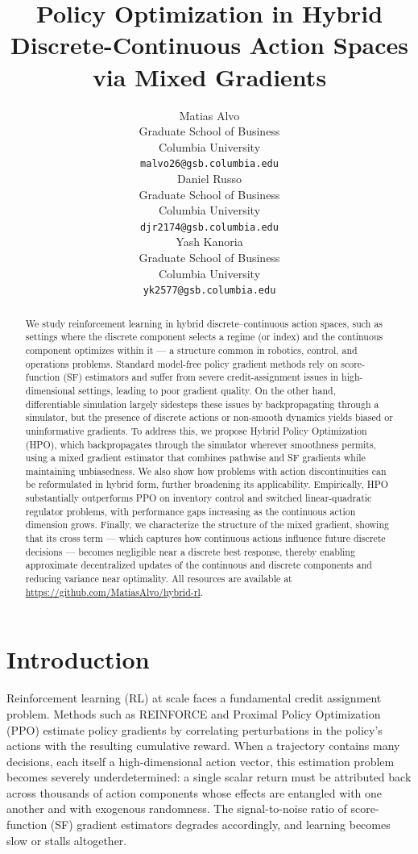 \documentclass{article}
\title{Policy Optimization in Hybrid Discrete-Continuous Action Spaces via Mixed Gradients}
\author{%
  Matias Alvo \\
  Graduate School of Business\\
  Columbia University\\
  \texttt{malvo26@gsb.columbia.edu} \\
  \And
  Daniel Russo \\
  Graduate School of Business\\
  Columbia University\\
  \texttt{djr2174@gsb.columbia.edu} \\
  \AND
  Yash Kanoria \\
  Graduate School of Business\\
  Columbia University\\
  \texttt{yk2577@gsb.columbia.edu} \\
}
\theoremstyle{definition}
\theoremstyle{remark}
\begin{document}
\maketitle



\begin{abstract}

We study reinforcement learning in hybrid discrete–continuous action spaces, such as settings where the discrete component selects a regime (or index) and the continuous component optimizes within it — a structure common in robotics, control, and operations problems. Standard model-free policy gradient methods rely on score-function (SF) estimators and suffer from severe credit-assignment issues in high-dimensional settings, leading to poor gradient quality. On the other hand, differentiable simulation largely sidesteps these issues by backpropagating through a simulator, but the presence of discrete actions or non-smooth dynamics yields biased or uninformative gradients.
To address this, we propose Hybrid Policy Optimization (HPO), which backpropagates through the simulator wherever smoothness permits, using a mixed gradient estimator that combines pathwise and SF gradients while maintaining unbiasedness. We also show how problems with action discontinuities can be reformulated in hybrid form, further broadening its applicability. Empirically, HPO substantially outperforms PPO on inventory control and switched linear-quadratic regulator problems, with performance gaps increasing as the continuous action dimension grows.
Finally, we characterize the structure of the mixed gradient, showing that its cross term — which captures how continuous actions influence future discrete decisions — becomes negligible near a discrete best response, thereby enabling approximate decentralized updates of the continuous and discrete components and reducing variance near optimality.
All resources are available at \url{https://github.com/MatiasAlvo/hybrid-rl}.

\end{abstract}



\section{Introduction}
\label{sec:introduction}



Reinforcement learning (RL) at scale faces a fundamental credit assignment problem. Methods such as REINFORCE \citep{williams1992simple} and Proximal Policy Optimization (PPO) \citep{schulman2017proximal} estimate policy gradients by correlating perturbations in the policy's actions with the resulting cumulative reward. When a trajectory contains many decisions, each itself a high-dimensional action vector, this estimation problem becomes severely underdetermined: a single scalar return must be attributed back across thousands of action components whose effects are entangled with one another and with exogenous randomness. The signal-to-noise ratio of score-function (SF) gradient estimators degrades accordingly, and learning becomes slow or stalls altogether.
\end{document}
